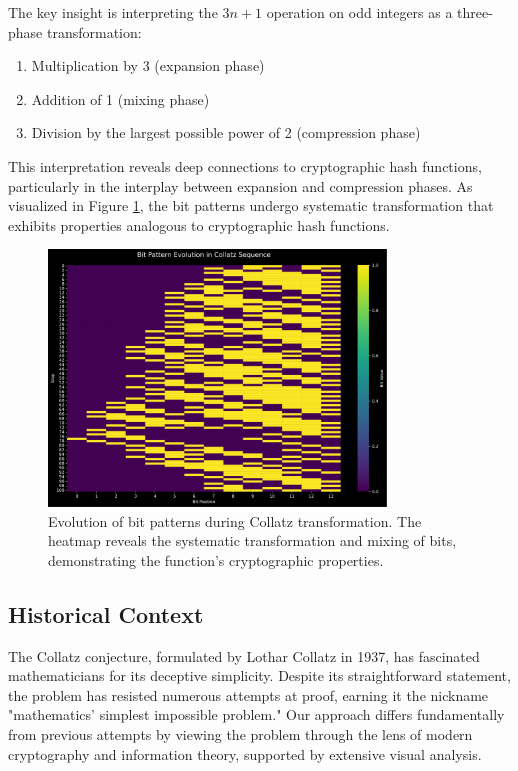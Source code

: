 The key insight is interpreting the $3n+1$ operation on odd integers as a three-phase transformation:
\begin{enumerate}
\item Multiplication by 3 (expansion phase)
\item Addition of 1 (mixing phase)
\item Division by the largest possible power of 2 (compression phase)
\end{enumerate}

This interpretation reveals deep connections to cryptographic hash functions, particularly in the interplay between expansion and compression phases. As visualized in Figure \ref{fig:bit_evolution}, the bit patterns undergo systematic transformation that exhibits properties analogous to cryptographic hash functions.

\begin{figure}[h]
\centering
\includegraphics[width=0.8\textwidth]{figures/bit_evolution.svg}
\caption{Evolution of bit patterns during Collatz transformation. The heatmap reveals the systematic transformation and mixing of bits, demonstrating the function's cryptographic properties.}
\label{fig:bit_evolution}
\end{figure}

\subsection{Historical Context}
The Collatz conjecture, formulated by Lothar Collatz in 1937, has fascinated mathematicians for its deceptive simplicity. Despite its straightforward statement, the problem has resisted numerous attempts at proof, earning it the nickname "mathematics' simplest impossible problem." Our approach differs fundamentally from previous attempts by viewing the problem through the lens of modern cryptography and information theory, supported by extensive visual analysis.

